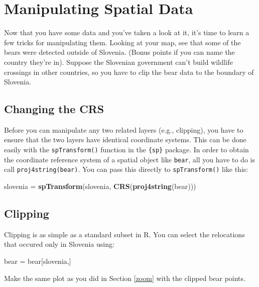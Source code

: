 \documentclass[]{book}
\newenvironment{Shaded}{\begin{snugshade}}{\end{snugshade}}
\newcommand{\KeywordTok}[1]{\textcolor[rgb]{0.13,0.29,0.53}{\textbf{#1}}}
\newcommand{\StringTok}[1]{\textcolor[rgb]{0.31,0.60,0.02}{#1}}
\newcommand{\NormalTok}[1]{#1}
\theoremstyle{definition}
\theoremstyle{definition}
\theoremstyle{definition}
\theoremstyle{remark}
\begin{document}
\section{Manipulating Spatial Data}\label{ManipSpat}

Now that you have some data and you've taken a look at it, it's time to
learn a few tricks for manipulating them. Looking at your map, see that
some of the bears were detected outside of Slovenia. (Bonus points if
you can name the country they're in). Suppose the Slovenian government
can't build wildlife crossings in other countries, so you have to clip
the bear data to the boundary of Slovenia.

\subsection{Changing the CRS}\label{crs}

Before you can manipulate any two related layers (e.g., clipping), you
have to ensure that the two layers have identical coordinate systems.
This can be done easily with the \texttt{spTransform()} function in the
\texttt{\{sp\}} package. In order to obtain the coordinate reference
system of a spatial object like \texttt{bear}, all you have to do is
call \texttt{proj4string(bear)}. You can pass this directly to
\texttt{spTransform()} like this:

\begin{Shaded}
\begin{Highlighting}[]
\NormalTok{slovenia =}\StringTok{ }\KeywordTok{spTransform}\NormalTok{(slovenia, }\KeywordTok{CRS}\NormalTok{(}\KeywordTok{proj4string}\NormalTok{(bear))) }
\end{Highlighting}
\end{Shaded}

\subsection{Clipping}\label{clip}

Clipping is as simple as a standard subset in R. You can select the
relocations that occured only in Slovenia using:

\begin{Shaded}
\begin{Highlighting}[]
\NormalTok{bear =}\StringTok{ }\NormalTok{bear[slovenia,]}
\end{Highlighting}
\end{Shaded}

Make the same plot as you did in Section \ref{zoom} with the clipped
bear points.
\end{document}
